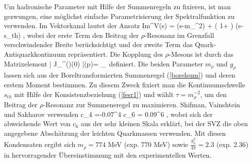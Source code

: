 Um hadronische Parameter mit Hilfe der Summenregeln zu fixieren, 
ist man gezwungen, eine m\"oglichst einfache Parametrisierung der
Spektralfunktion zu verwenden. Im Vektorkanal lautet der Ansatz
\be
\label{zerow}
  {\rm Im}\Pi^V(s) = 
    \delta (s-m_\rho^2) + 
     \left( 1+ \right) \Theta (s-s_{th})\; ,
\ee
wobei der erste Term den Beitrag der $\rho$-Resonanz im Grenzfall
verschwindender Breite ber\"ucksichtigt und der zweite 
Term das Quark-Antiquarkkontinuum repr\"asentiert. Die Kopplung
des $\rho$-Mesons ist durch das Matrixelement
\be
  | J_\mu^{(\rho)}(0) |\rho (p)\rangle  = \epsilon_\mu \,
\ee
definiert. Die beiden Parameter $m_\rho$ und $g_\rho$ lassen sich aus 
der Boreltransformierten Summenregel (\ref{borelsum}) und deren 
erstem Moment bestimmen. Zu diesem Zweck fixiert man die 
Kontinuumschwelle $s_{th}$ mit Hilfe der Konsistenzbeziehung
(\ref{fesr1}) und w\"ahlt $\tau =m_\rho^{-2}$, um den Beitrag der
$\rho$-Resonanz zur Summeneregel zu maximieren. 
Shifman, Vainshtein und Sakharov \cite{SVZ79} verwenden
\be
\label{svzval}
 c_4 =-0.07^4\hspace{1.5cm}  c_6 = 0.09^6 ,
\ee
wobei sich der abweichende Wert von $c_6$ aus der sehr kleinen 
Skala erkl\"art, bei der SVZ die oben angegebene Absch\"atzung der 
leichten Quarkmassen verwenden. Mit diesen Kondensaten ergibt sich 
$m_\rho = 774$ MeV (exp. 770 MeV) sowie $\frac{g_\rho^2}{4\pi} = 2.3$
(exp. 2.36) in hervorragender \"Ubereinstimmung mit den experimentellen 
Werten. 

